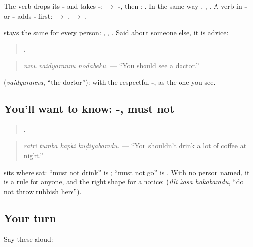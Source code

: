The verb drops its \textbf{-} and takes \textbf{-}: \textbf{} $\to$ \textbf{-}, then \textbf{}: \textbf{}. In the same way \textbf{}, \textbf{}, \textbf{}. A verb in \textbf{-} or \textbf{-} adds \textbf{-} first: \textbf{} $\to$ \textbf{}, \textbf{} $\to$ \textbf{}.

\textbf{} stays the same for every person: \textbf{ }, \textbf{ }, \textbf{ }. Said about someone else, it is advice:

\begin{quote}
\textbf{  .}
\end{quote}

\begin{quote}
\emph{nīvu vaidyarannu nōḍabēku.} — \textquotedblleft{}You should see a doctor.\textquotedblright{}
\end{quote}

\textbf{} (\emph{vaidyarannu}, \textquotedblleft{}the doctor\textquotedblright{}): \textbf{} with the respectful \textbf{-}, as the one you see.

\subsection*{You'll want to know: -, must not}
\begin{quote}
\textbf{   .}
\end{quote}

\begin{quote}
\emph{rātri tumbā kāphi kuḍiyabāradu.} — \textquotedblleft{}You shouldn't drink a lot of coffee at night.\textquotedblright{}
\end{quote}

\textbf{} sits where \textbf{} sat: \textquotedblleft{}must not drink\textquotedblright{} is \textbf{}; \textquotedblleft{}must not go\textquotedblright{} is \textbf{}. With no person named, it is a rule for anyone, and the right shape for a notice: \textbf{  } (\emph{illi kasa hākabāradu}, \textquotedblleft{}do not throw rubbish here\textquotedblright{}).

\subsection*{Your turn}
Say these aloud:

